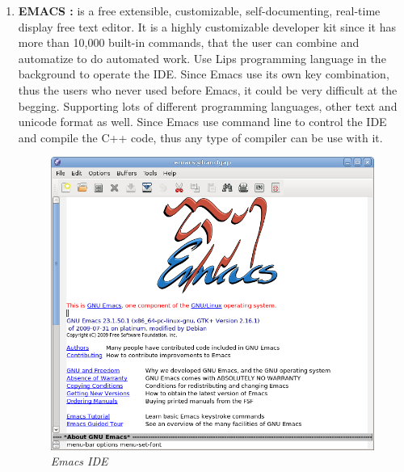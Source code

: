 \documentclass[12pt]{article}
\begin{document}
{{\begin{enumerate}
Netbeans provide version control in default for some remote system:
\begin{enumerate}
\item Git
\item Mercurial
\item Subversion
\item other extensions/plugins are available to connect to different version control systems.
\end{enumerate} 

Supported platforms : 
\begin{enumerate}
\item Linux
\item Windows
\item MacOS
\end{enumerate}

\item \textbf{EMACS : } is a free extensible, customizable, self-documenting, real-time display free text editor. It is a highly customizable developer kit since it has more than 10,000 built-in commands, that the user can combine and automatize to do automated work. Use Lips programming language in the background to operate the IDE. Since Emacs use its own key combination, thus the users who never used before Emacs, it could be very difficult at the begging. Supporting lots of different programming languages, other text and unicode format as well. Since Emacs use command line to control the IDE and compile the C++ code, thus any type of compiler can be use with it.\cite{Emacs}\\

\begin{figure}[h!]
\centering
\includegraphics[scale=0.5]{Pictures/emacs.png}
\caption{\textit{\color{gray}Emacs IDE \cite{gnu}}}
\end{figure}


\end{enumerate}}}
\end{document}
